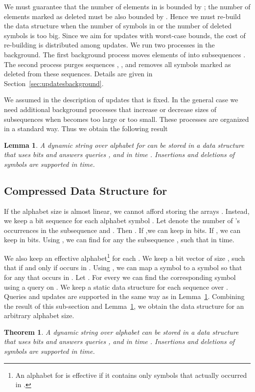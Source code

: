 \documentclass[11pt]{article}\usepackage{fullpage}
\newcommand{\no}[1]{}
\newtheorem{theorem}{Theorem}
\newtheorem{lemma}{Lemma}
\newcommand{\shortver}[1]{}
\begin{document}
We must guarantee that the number of elements in  is bounded by ; the number of elements marked as deleted must be also bounded by . Hence we must re-build the data structure when the number of symbols in  or the number of deleted symbols is too big. Since we aim for updates with worst-case bounds, the cost of re-building is distributed among  updates. We run two processes in the background. The first background process moves elements of  into subsequences . The second process purges sequences , ,  and removes all symbols marked as deleted from these sequences. Details are given in Section~\ref{sec:updatesbackground}. 


We assumed in the description of updates that  is fixed. In the general case we need additional background processes that increase or decrease sizes of subsequences when  becomes too large or too small. These processes are organized in a standard way. \no{and will be described in the full version of this paper.}
Thus we obtain the following result
\begin{lemma}
  \label{lemma:midsigma}
A dynamic string   over alphabet  for 
can be stored in a data structure that uses  bits and answers queries
,  and  in time .
Insertions and deletions of symbols are supported in  time. 
\end{lemma}
\shortver{In the full version of this paper we show that the space usage of the above described data structure can be reduced to  bits. We also show how the result of Lemma~\ref{lemma:midsigma} can be extended to the case when .  The full version also contains the description of the static data structure and presents the procedure for extracting a substring  of  in 
 time.}

\subsection{Compressed Data Structure for }
\label{sec:bigsigma}
If the alphabet size  is almost linear, we cannot afford storing the arrays 
. 
Instead, we keep a bit sequence  for each alphabet symbol .
Let  denote the number of 's occurrences in the subsequence  and . Then  . 
If ,we can keep  in  bits.
If , we can keep  in  bits.
Using , we can find for any  the subsequence , such that  in  time.

We also keep an effective alphabet\footnote{An alphabet for  is effective if it contains only symbols that actually occurred in .} for each . We keep 
a bit vector  of size , such that  if and only if  occurs in . Using , we can map a symbol  to a symbol  
so that  for any  that occurs in . Let . For every  we can find the corresponding symbol  
using a  query on . We keep a static data structure for each sequence  over .
Queries and updates are supported in the same way as in Lemma~\ref{lemma:midsigma}. Combining the result of this sub-section and Lemma~\ref{lemma:midsigma}, we obtain 
the data structure for an arbitrary alphabet size.
\begin{theorem}
  \label{theor:anysigma}
A dynamic string   over alphabet  
can be stored in a data structure that uses  bits and answers queries ,  and  in time .
Insertions and deletions of symbols are supported in  time. 
\end{theorem}
\end{document}
